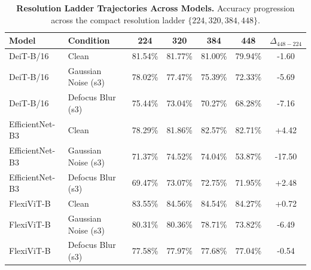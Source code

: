 \begin{table}[t]
\centering
\small
\caption{\textbf{Resolution Ladder Trajectories Across Models.}
Accuracy progression across the compact resolution ladder $\{224, 320, 384, 448\}$.}
\label{tab:res_ladder}
\begin{tabular}{llccccc}
\toprule
\textbf{Model} & \textbf{Condition} & \textbf{224} & \textbf{320} & \textbf{384} & \textbf{448} & $\Delta_{448 - 224}$ \\
\midrule
DeiT-B/16 & Clean & 81.54\% & 81.77\% & 81.00\% & 79.94\% & -1.60 \\
DeiT-B/16 & Gaussian Noise (s3) & 78.02\% & 77.47\% & 75.39\% & 72.33\% & -5.69 \\
DeiT-B/16 & Defocus Blur (s3) & 75.44\% & 73.04\% & 70.27\% & 68.28\% & -7.16 \\
EfficientNet-B3 & Clean & 78.29\% & 81.86\% & 82.57\% & 82.71\% & +4.42 \\
EfficientNet-B3 & Gaussian Noise (s3) & 71.37\% & 74.52\% & 74.04\% & 53.87\% & -17.50 \\
EfficientNet-B3 & Defocus Blur (s3) & 69.47\% & 73.07\% & 72.75\% & 71.95\% & +2.48 \\
FlexiViT-B & Clean & 83.55\% & 84.56\% & 84.54\% & 84.27\% & +0.72 \\
FlexiViT-B & Gaussian Noise (s3) & 80.31\% & 80.36\% & 78.71\% & 73.82\% & -6.49 \\
FlexiViT-B & Defocus Blur (s3) & 77.58\% & 77.97\% & 77.68\% & 77.04\% & -0.54 \\
\bottomrule
\end{tabular}
\end{table}

